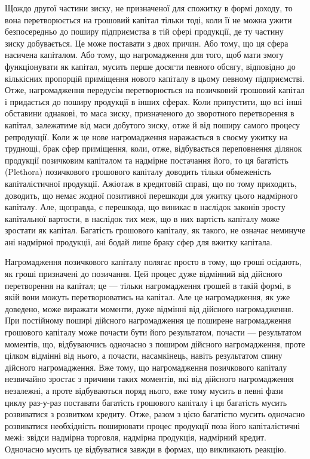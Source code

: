 Щождо другої частини зиску, не призначеної для спожитку в формі доходу,
то вона перетворюється на грошовий капітал тільки тоді, коли її не можна
ужити безпосередньо до поширу підприємства в тій сфері продукції, де ту частину
зиску добувається. Це може поставати з двох причин. Або тому, що ця сфера
насичена капіталом. Або тому, що нагромадження для того, щоб мати змогу
функціонувати як капітал, мусить перше досягти певного обсягу, відповідно
до кількісних пропорцій приміщення нового капіталу в цьому певному підприємстві.
Отже, нагромадження передусім перетворюється на позичковий грошовий капітал
і придається до поширу продукції в інших сферах. Коли припустити, що всі
інші обставини однакові, то маса зиску, призначеного до зворотного перетворення
в капітал, залежатиме від маси добутого зиску, отже й від поширу самого процесу
репродукції. Коли ж це нове нагромадження наражається в своєму ужитку
на труднощі, брак сфер приміщення, коли, отже, відбувається переповнення ділянок
продукції позичковим капіталом та надмірне постачання його, то ця багатість
(Plethora) позичкового грошового капіталу доводить тільки обмеженість капіталістичної
продукції. Ажіотаж в кредитовій справі, що по тому приходить, доводить,
що немає жодної позитивної перешкоди для ужитку цього надмірного капіталу.
Але, щоправда, є перешкода, що виникає в наслідок законів зросту капітальної
вартости, в наслідок тих меж, що в них вартість капіталу може зростати
як капітал. Багатість грошового капіталу, як такого, не означає неминуче ані
надмірної продукції, ані бодай лише браку сфер для вжитку капітала.

Нагромадження позичкового капіталу полягає просто в тому, що гроші
осідають, як гроші призначені до позичання. Цей процес дуже відмінний від
дійсного перетворення на капітал; це — тільки нагромадження грошей в такій
формі, в якій вони можуть перетворюватись на капітал. Але це нагромадження,
як уже доведено, може виражати моменти, дуже відмінні від дійсного нагромадження.
При постійному поширі дійсного нагромадження це поширене нагромадження
грошового капіталу може почасти бути його результатом, почасти —
результатом моментів, що, відбуваючись одночасно з поширом дійсного нагромадження,
проте цілком відмінні від нього, а почасти, насамкінець, навіть результатом
спину дійсного нагромадження. Вже тому, що нагромадження позичкового
капіталу незвичайно зростає з причини таких моментів, які від дійсного
нагромадження незалежні, а проте відбуваються поряд нього, вже тому мусить
в певні фази циклу раз-у-раз поставати багатість грошового капіталу і ця
багатість мусить розвиватися з розвитком кредиту. Отже, разом з цією багатістю
мусить одночасно розвиватися необхідність поширювати процес продукції поза його
капіталістичні межі: звідси надмірна торговля, надмірна продукція, надмірний
кредит. Одночасно мусить це відбуватися завжди в формах, що викликають
реакцію.


